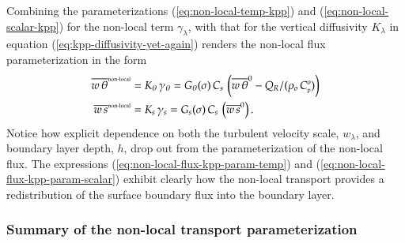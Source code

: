 \begin{itemize}
Combining the parameterizations (\ref{eq:non-local-temp-kpp}) and
(\ref{eq:non-local-scalar-kpp}) for the non-local term
$\gamma_{\lambda}$, with that for the vertical diffusivity
$K_{\lambda}$ in equation (\ref{eq:kpp-diffusivity-yet-again}) renders
the non-local flux parameterization in the form
\begin{align}
\overline{w \, \theta}^{\mbox{\tiny non-local}} &= K_{\theta}  \, \gamma_{\theta}
  = 
 G_{\theta}(\sigma) \, C_{s} \, \left( \overline{w \, \theta}^{0} - Q_{R}/(\rho_{o} \, C_{\mbox{\tiny p}}^{o}) \right)
\label{eq:non-local-flux-kpp-param-temp}
\\
\overline{w \, s}^{\mbox{\tiny non-local}} &= K_{s}  \, \gamma_{s}
  = 
 G_{s}(\sigma) \, C_{s}\,\left( \overline{w \, s}^{0} \right).
\label{eq:non-local-flux-kpp-param-scalar}
\end{align}
Notice how explicit dependence on both the turbulent velocity scale,
$w_{\lambda}$, and boundary layer depth, $h$, drop out from the
parameterization of the non-local flux.  The expressions
(\ref{eq:non-local-flux-kpp-param-temp}) and
(\ref{eq:non-local-flux-kpp-param-scalar}) exhibit clearly how the
non-local transport provides a redistribution of the surface boundary
flux into the boundary layer.

\end{itemize}



\subsubsection{Summary of the non-local transport parameterization} 

